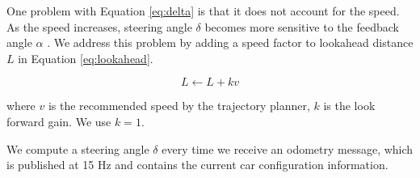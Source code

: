 One problem with Equation \eqref{eq:delta} is that it does not account for the
speed. As the speed increases, steering angle $\delta$ becomes more sensitive
to the feedback angle $\alpha$ \cite{Kim2013SensorbasedMP}. We address this
problem by adding a speed factor to lookahead distance $L$ in Equation
\eqref{eq:lookahead}.

\begin{equation}
  L \leftarrow L + kv
  \label{eq:lookahead}
\end{equation}

where $v$ is the recommended speed by the trajectory planner, $k$ is the look
forward gain. We use $k = 1$.

We compute a steering angle $\delta$ every time we receive an odometry message,
which is published at 15 Hz and contains the current car configuration
information.
